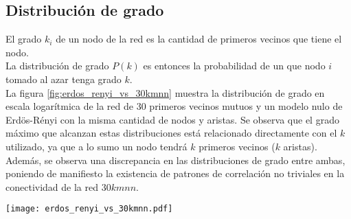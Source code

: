 \subsection*{Distribución de grado}
El grado $k_i$ de un nodo de la red es la cantidad de primeros vecinos que tiene el nodo.\\
La distribución de grado $P(k)$ es entonces la probabilidad de un que nodo $i$ tomado al azar tenga grado $k$.\\La figura \ref{fig:erdos_renyi_vs_30kmnn} muestra la distribución de grado en escala logarítmica de la red de 30 primeros vecinos mutuos y un modelo nulo de Erdös-Rényi con la misma cantidad de nodos y aristas. Se observa que el grado máximo que alcanzan estas distribuciones está relacionado directamente con el $k$ utilizado, ya que a lo sumo un nodo tendrá $k$ primeros vecinos ($k$ aristas). Además, se observa una discrepancia en las distribuciones de grado entre ambas, poniendo de manifiesto la existencia de patrones de correlación no triviales en la conectividad de la red $30kmnn$.
\begin{center}
\texttt{[image: erdos\_renyi\_vs\_30kmnn.pdf]}
\label{fig:erdos_renyi_vs_30kmnn}
\end{center}
